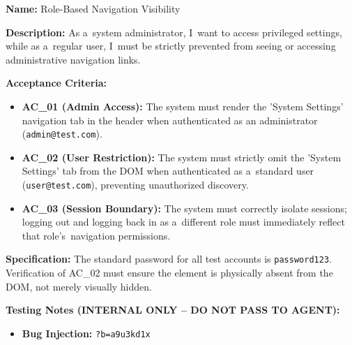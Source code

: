 \documentclass[czech, ing, kiv, he, iso690numb, viewonly]{fasthesis}
\begin{document}
\begin{tcolorbox}[breakable, colback=gray!4, colframe=black!35, boxrule=0.4pt, arc=2pt, boxsep=1pt, left=3pt, right=3pt, top=2pt, bottom=2pt, before skip=6pt, after skip=6pt, fontupper=\small, title={US-03 -- Role-Based Navigation Visibility}]
\textbf{Name:} Role-Based Navigation Visibility

\textbf{Description:} As a~system administrator, I~want to access privileged settings, while as a~regular user, I~must be strictly prevented from seeing or accessing administrative navigation links.

\textbf{Acceptance Criteria:}
\begin{itemize}
    \item \textbf{AC\_01 (Admin Access):} The system must render the 'System Settings' navigation tab in the header when authenticated as an administrator (\texttt{admin@test.com}).
    \item \textbf{AC\_02 (User Restriction):} The system must strictly omit the 'System Settings' tab from the DOM when authenticated as a~standard user (\texttt{user@test.com}), preventing unauthorized discovery.
    \item \textbf{AC\_03 (Session Boundary):} The system must correctly isolate sessions; logging out and logging back in as a~different role must immediately reflect that role's~navigation permissions.
\end{itemize}

\textbf{Specification:} The standard password for all test accounts is \texttt{password123}. Verification of AC\_02 must ensure the element is physically absent from the DOM, not merely visually hidden.

\textbf{\textcolor{BrickRed}{Testing Notes (INTERNAL ONLY -- DO NOT PASS TO AGENT):}}
\begin{itemize}
    \item \textbf{Bug Injection:} \texttt{?b=a9u3kd1x}
\end{itemize}
\end{tcolorbox}
\end{document}
